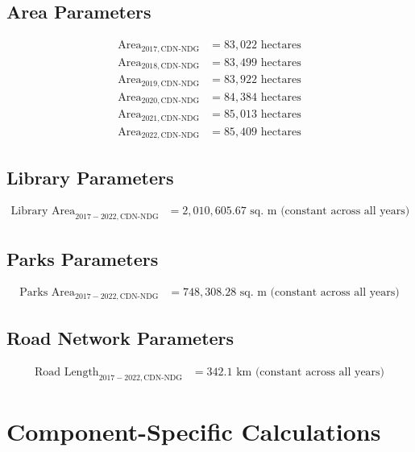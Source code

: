 \documentclass{article}
\begin{document}
\subsection{Area Parameters}

\begin{align}
\text{Area}_{2017,\text{CDN-NDG}} &= 83,022 \text{ hectares}\\
\text{Area}_{2018,\text{CDN-NDG}} &= 83,499 \text{ hectares}\\
\text{Area}_{2019,\text{CDN-NDG}} &= 83,922 \text{ hectares}\\
\text{Area}_{2020,\text{CDN-NDG}} &= 84,384 \text{ hectares}\\
\text{Area}_{2021,\text{CDN-NDG}} &= 85,013 \text{ hectares}\\
\text{Area}_{2022,\text{CDN-NDG}} &= 85,409 \text{ hectares}
\end{align}

\subsection{Library Parameters}

\begin{align}
\text{Library Area}_{2017-2022,\text{CDN-NDG}} &= 2,010,605.67 \text{ sq. m} \text{ (constant across all years)}
\end{align}

\subsection{Parks Parameters}

\begin{align}
\text{Parks Area}_{2017-2022,\text{CDN-NDG}} &= 748,308.28 \text{ sq. m} \text{ (constant across all years)}
\end{align}

\subsection{Road Network Parameters}

\begin{align}
\text{Road Length}_{2017-2022,\text{CDN-NDG}} &= 342.1 \text{ km} \text{ (constant across all years)}
\end{align}

\section{Component-Specific Calculations}
\end{document}

